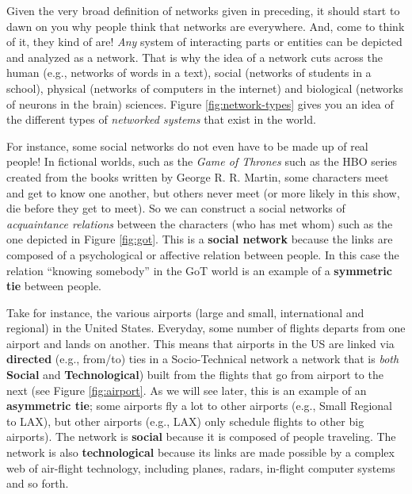 \documentclass[]{tufte-book}
\begin{document}
Given the very broad definition of networks given in preceding, it should start to dawn on you why people think that networks are everywhere. And, come to think of it, they kind of are! \emph{Any} system of interacting parts or entities can be depicted and analyzed as a network. That is why the idea of a network cuts across the human (e.g., networks of words in a text), social (networks of students in a school), physical (networks of computers in the internet) and biological (networks of neurons in the brain) sciences. Figure \ref{fig:network-types} gives you an idea of the different types of \emph{networked systems} that exist in the world.

For instance, some social networks do not even have to be made up of real people! In fictional worlds, such as the \emph{Game of Thrones} such as the HBO series created from the books written by George R. R. Martin, some characters meet and get to know one another, but others never meet (or more likely in this show, die before they get to meet). So we can construct a social networks of \emph{acquaintance relations} between the characters (who has met whom) such as the one depicted in Figure \ref{fig:got}. This is a \textbf{social network} because the links are composed of a psychological or affective relation between people. In this case the relation ``knowing somebody'' in the GoT world is an example of a \textbf{symmetric tie} between people.

Take for instance, the various airports (large and small, international and regional) in the United States. Everyday, some number of flights departs from one airport and lands on another. This means that airports in the US are linked via \textbf{directed} (e.g., from/to) ties in a Socio-Technical network a network that is \emph{both} \textbf{Social} and \textbf{Technological}) built from the flights that go from airport to the next (see Figure \ref{fig:airport}. As we will see later, this is an example of an \textbf{asymmetric tie}; some airports fly a lot to other airports (e.g., Small Regional to LAX), but other airports (e.g., LAX) only schedule flights to other big airports). The network is \textbf{social} because it is composed of people traveling. The network is also \textbf{technological} because its links are made possible by a complex web of air-flight technology, including planes, radars, in-flight computer systems and so forth.
\end{document}
